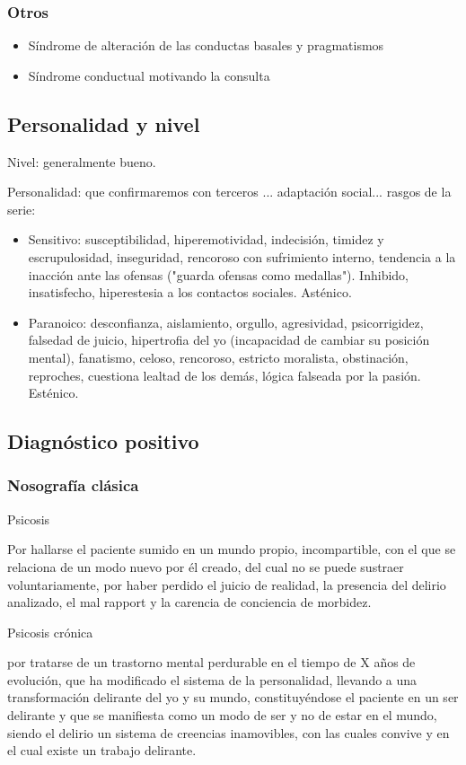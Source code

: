 \subsubsection*{Otros}
\begin{itemize}
	\item Síndrome de alteración de las conductas basales y pragmatismos
	\item Síndrome conductual motivando la consulta
\end{itemize}
\subsection*{Personalidad y nivel}

Nivel: generalmente bueno.

Personalidad: que confirmaremos con terceros ... adaptación social... rasgos de la serie:
\begin{itemize}
	\item Sensitivo: susceptibilidad, hiperemotividad, indecisión, timidez y escrupulosidad, inseguridad, rencoroso con sufrimiento interno, tendencia a la inacción ante las ofensas ("guarda ofensas como medallas"). Inhibido, insatisfecho, hiperestesia a los contactos sociales. Asténico.
	\item Paranoico: desconfianza, aislamiento, orgullo, agresividad, psicorrigidez, falsedad de juicio, hipertrofia del yo (incapacidad de cambiar su posición mental), fanatismo, celoso, rencoroso, estricto moralista, obstinación, reproches, cuestiona lealtad de los demás, lógica falseada por la pasión. Esténico.
\end{itemize}
\subsection*{Diagnóstico positivo}
\subsubsection*{Nosografía clásica}
Psicosis

Por hallarse el paciente sumido en un mundo propio, incompartible, con el que se relaciona de un modo nuevo por él creado, del cual no se puede sustraer voluntariamente, por haber perdido el juicio de realidad, la presencia del delirio analizado, el mal rapport y la carencia de conciencia de morbidez.

Psicosis crónica

por tratarse de un trastorno mental perdurable en el tiempo de X años de evolución, que ha modificado el sistema de la personalidad, llevando a una transformación delirante del yo y su mundo, constituyéndose el paciente en un ser delirante y que se manifiesta como un modo de ser y no de estar en el mundo, siendo el delirio un sistema de creencias inamovibles, con las cuales convive y en el cual existe un trabajo delirante.

